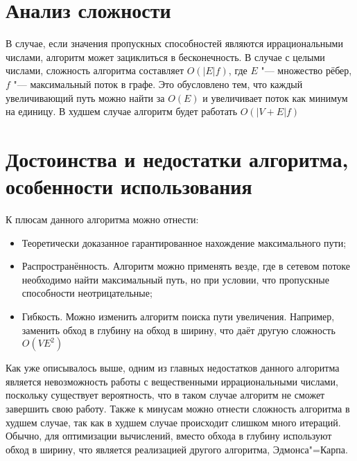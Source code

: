 \documentclass[otchet, times]{SCWorks}
\begin{document}
\section{Анализ сложности}
В случае, если значения пропускных способностей являются иррациональными числами, алгоритм может зациклиться в бесконечность. В случае с целыми числами, сложность алгоритма составляет $O(|E|f)$, где $E$ "--- множество рёбер, $f$ "--- максимальный поток в графе. Это обусловлено тем, что каждый увеличивающий путь можно найти за $O(E)$ и увеличивает поток как минимум на единицу. В худшем случае алгоритм будет работать $O(|V+E|f)$

\section{Достоинства и недостатки алгоритма, особенности использования}
К плюсам данного алгоритма можно отнести:
\begin{itemize}
    \item Теоретически доказанное гарантированное нахождение максимального пути;
    \item Распространённость. Алгоритм можно применять везде, где в сетевом потоке необходимо найти максимальный путь, но при условии, что пропускные способности неотрицательные;
    \item Гибкость. Можно изменить алгоритм поиска пути увеличения. Например, заменить обход в глубину на обход в ширину, что даёт другую сложность $O(VE^2)$
\end{itemize}

Как уже описывалось выше, одним из главных недостатков данного алгоритма является невозможность работы с вещественными иррациональными числами, поскольку существует вероятность, что в таком случае алгоритм не сможет завершить свою работу. Также к минусам можно отнести сложность алгоритма в худшем случае, так как в худшем случае происходит слишком много итераций. Обычно, для оптимизации вычислений, вместо обхода в глубину используют обход в ширину, что является реализацией другого алгоритма, Эдмонса"=Карпа.




\end{document}
